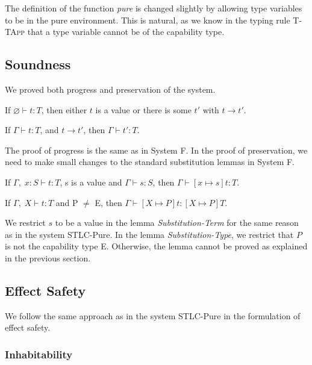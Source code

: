 The definition of the function \emph{pure} is changed slightly by
allowing type variables to be in the pure environment. This is
natural, as we know in the typing rule \textsc{T-TApp} that a type
variable cannot be of the capability type.

\subsection{Soundness}

We proved both progress and preservation of the system.

\begin{theorem}[Progress]
If $\varnothing \vdash t : T$, then either $t$ is a value or there is some
$t'$ with $t \longrightarrow t'$.
\end{theorem}

\begin{theorem}[Preservation]
If $\Gamma \vdash t : T$, and $t \longrightarrow t'$, then $\Gamma
\vdash t' : T$.
\end{theorem}

The proof of progress is the same as in System F. In the proof of
preservation, we need to make small changes to the standard
substitution lemmas in System F.

\begin{lemma}
  If $\Gamma,\; x:S \vdash t : T$, s is a value and
  $\Gamma \vdash s : S$, then $\Gamma \vdash [x \mapsto s]t : T$.
\end{lemma}

\begin{lemma}
  If $\Gamma,\; X \vdash t : T$ and P $\neq$ E,
  then $\Gamma \vdash [X \mapsto P]t : [X \mapsto P]T$.
\end{lemma}

We restrict $s$ to be a value in the lemma \emph{Substitution-Term}
for the same reason as in the system STLC-Pure. In the lemma
\emph{Substitution-Type}, we restrict that $P$ is not the capability
type E. Otherwise, the lemma cannot be proved as explained in the
previous section.

\subsection{Effect Safety}

We follow the same approach as in the system STLC-Pure in the
formulation of effect safety.

\subsubsection{Inhabitability}

